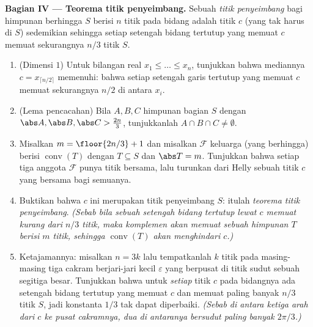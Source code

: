 \begin{problem}
\medskip
\noindent\textbf{Bagian IV --- Teorema titik penyeimbang.} Sebuah
\emph{titik penyeimbang} bagi himpunan berhingga $S$ berisi $n$ titik pada
bidang adalah titik $c$ (yang tak harus di $S$) sedemikian sehingga setiap
setengah bidang tertutup yang memuat $c$ memuat sekurangnya $n/3$
titik $S$.
\begin{enumerate}[resume]
  \item (Dimensi $1$) Untuk bilangan real $x_1 \leq \dots \leq x_n$,
        tunjukkan bahwa mediannya $c = x_{\lceil n/2 \rceil}$
        memenuhi: bahwa setiap setengah garis tertutup yang memuat $c$
        memuat sekurangnya $n/2$ di antara $x_i$.
  \item (Lema pencacahan) Bila $A, B, C$ himpunan bagian $S$ dengan
        $\abs A, \abs B, \abs C > \tfrac{2n}3$, tunjukkanlah $A \cap
        B \cap C \neq \emptyset$.
  \item Misalkan $m = \floor{2n/3} + 1$ dan misalkan $\mathcal F$
        keluarga (yang berhingga) berisi 
        $\operatorname{conv}(T)$ dengan $T \subseteq S$ dan $\abs T =
        m$. Tunjukkan bahwa setiap tiga anggota $\mathcal F$ punya
        titik bersama, lalu turunkan dari Helly sebuah titik $c$ yang
        bersama bagi semuanya.
  \item Buktikan bahwa $c$ ini merupakan titik penyeimbang $S$: itulah
        \emph{teorema titik penyeimbang}. \emph{(Sebab bila sebuah setengah
        bidang tertutup lewat $c$ memuat kurang dari $n/3$
        titik, maka komplemen  akan memuat sebuah himpunan $T$
        berisi $m$ titik, sehingga $\operatorname{conv}(T)$ akan
        menghindari $c$.)}
  \item Ketajamannya: misalkan $n = 3k$ lalu tempatkanlah $k$ titik pada
        masing-masing tiga cakram berjari-jari kecil $\varepsilon$ yang berpusat
        di titik sudut sebuah segitiga besar. Tunjukkan bahwa untuk
        \emph{setiap} titik $c$ pada bidangnya ada setengah
        bidang tertutup yang memuat $c$ dan memuat paling banyak $n/3$
        titik $S$, jadi konstanta $1/3$ tak dapat
        diperbaiki. \emph{(Sebab di antara ketiga arah dari $c$
        ke pusat cakramnya, dua di antaranya bersudut paling banyak
        $2\pi/3$.)}
\end{enumerate}


\end{problem}
